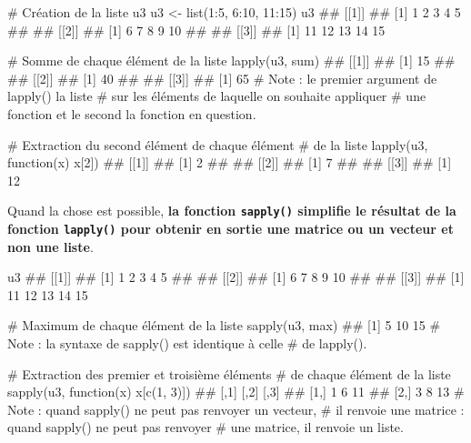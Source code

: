 \documentclass[12pt,twosided, notitlepage]{book}
\newenvironment{Shaded}{}{}
\newcommand{\KeywordTok}[1]{\textcolor[rgb]{0.00,0.00,1.00}{{#1}}}
\newcommand{\DecValTok}[1]{{#1}}
\newcommand{\StringTok}[1]{\textcolor[rgb]{0.00,0.50,0.50}{{#1}}}
\newcommand{\CommentTok}[1]{\textcolor[rgb]{0.00,0.50,0.00}{{#1}}}
\newcommand{\NormalTok}[1]{{#1}}
\renewenvironment{Shaded}{\begin{snugshade}}{\end{snugshade}}
\begin{document}
\begin{Shaded}
\begin{Highlighting}[]
\CommentTok{# Création de la liste u3}
\NormalTok{u3 <-}\StringTok{ }\KeywordTok{list}\NormalTok{(}\DecValTok{1}\NormalTok{:}\DecValTok{5}\NormalTok{, }\DecValTok{6}\NormalTok{:}\DecValTok{10}\NormalTok{, }\DecValTok{11}\NormalTok{:}\DecValTok{15}\NormalTok{)}
\NormalTok{u3}
  \NormalTok{## [[1]]}
  \NormalTok{## [1] 1 2 3 4 5}
  \NormalTok{## }
  \NormalTok{## [[2]]}
  \NormalTok{## [1]  6  7  8  9 10}
  \NormalTok{## }
  \NormalTok{## [[3]]}
  \NormalTok{## [1] 11 12 13 14 15}

\CommentTok{# Somme de chaque élément de la liste}
\KeywordTok{lapply}\NormalTok{(u3, sum)}
  \NormalTok{## [[1]]}
  \NormalTok{## [1] 15}
  \NormalTok{## }
  \NormalTok{## [[2]]}
  \NormalTok{## [1] 40}
  \NormalTok{## }
  \NormalTok{## [[3]]}
  \NormalTok{## [1] 65}
\CommentTok{# Note : le premier argument de lapply() la liste}
\CommentTok{# sur les éléments de laquelle on souhaite appliquer}
\CommentTok{# une fonction et le second la fonction en question.}

\CommentTok{# Extraction du second élément de chaque élément}
\CommentTok{# de la liste}
\KeywordTok{lapply}\NormalTok{(u3, function(x) x[}\DecValTok{2}\NormalTok{])}
  \NormalTok{## [[1]]}
  \NormalTok{## [1] 2}
  \NormalTok{## }
  \NormalTok{## [[2]]}
  \NormalTok{## [1] 7}
  \NormalTok{## }
  \NormalTok{## [[3]]}
  \NormalTok{## [1] 12}
\end{Highlighting}
\end{Shaded}

Quand la chose est possible, \textbf{la fonction \texttt{sapply()}
simplifie le résultat de la fonction \texttt{lapply()} pour obtenir en
sortie une matrice ou un vecteur et non une
liste}.

\begin{Shaded}
\begin{Highlighting}[]
\NormalTok{u3}
  \NormalTok{## [[1]]}
  \NormalTok{## [1] 1 2 3 4 5}
  \NormalTok{## }
  \NormalTok{## [[2]]}
  \NormalTok{## [1]  6  7  8  9 10}
  \NormalTok{## }
  \NormalTok{## [[3]]}
  \NormalTok{## [1] 11 12 13 14 15}

\CommentTok{# Maximum de chaque élément de la liste}
\KeywordTok{sapply}\NormalTok{(u3, max)}
  \NormalTok{## [1]  5 10 15}
\CommentTok{# Note : la syntaxe de sapply() est identique à celle}
\CommentTok{# de lapply().}

\CommentTok{# Extraction des premier et troisième éléments }
\CommentTok{# de chaque élément de la liste}
\KeywordTok{sapply}\NormalTok{(u3, function(x) x[}\KeywordTok{c}\NormalTok{(}\DecValTok{1}\NormalTok{, }\DecValTok{3}\NormalTok{)])}
  \NormalTok{##      [,1] [,2] [,3]}
  \NormalTok{## [1,]    1    6   11}
  \NormalTok{## [2,]    3    8   13}
\CommentTok{# Note : quand sapply() ne peut pas renvoyer un vecteur, }
\CommentTok{# il renvoie une matrice : quand sapply() ne peut pas renvoyer}
\CommentTok{# une matrice, il renvoie un liste. }
\end{Highlighting}
\end{Shaded}
\end{document}
